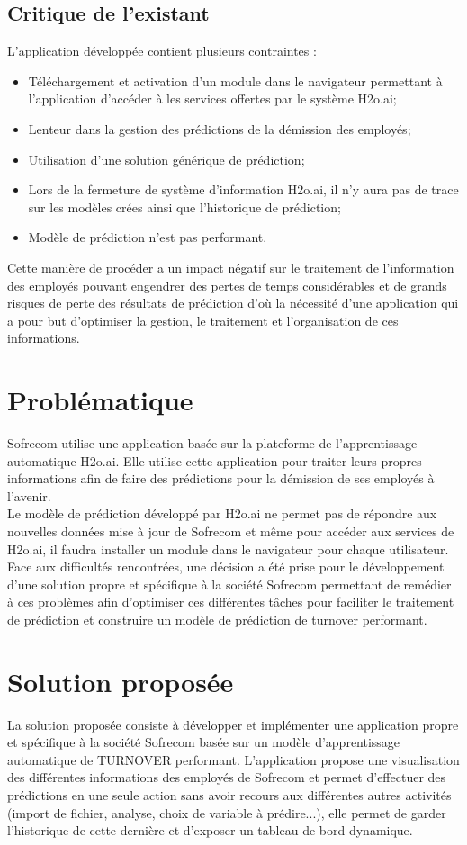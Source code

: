  \subsection{Critique de l’existant}
L'application développée contient plusieurs contraintes :
\begin{itemize}
    \item Téléchargement et activation d'un module dans le navigateur permettant à l'application d'accéder à les services offertes par le système H2o.ai;
     \item Lenteur dans la gestion des prédictions de la démission des employés;
     \item Utilisation d'une solution générique de prédiction;
      \item Lors de la fermeture de système d'information H2o.ai, il n'y aura pas de trace sur les modèles crées ainsi que l'historique de prédiction;
        \item Modèle de prédiction n'est pas performant.
\end{itemize}
\newpage
Cette manière de procéder a un impact négatif sur le traitement de l’information des employés pouvant engendrer des pertes de temps considérables et de grands risques de perte des résultats de prédiction d’où la nécessité d’une application qui a pour but d’optimiser la gestion, le traitement et l’organisation de ces informations.
\section{Problématique}
Sofrecom utilise une application basée sur la plateforme de l'apprentissage automatique H2o.ai.
Elle utilise cette application pour traiter leurs propres informations afin de faire des prédictions pour la démission de ses employés à l'avenir.\\
Le modèle de prédiction développé par H2o.ai ne permet pas de répondre aux nouvelles données mise à jour de Sofrecom et même pour accéder aux services de H2o.ai, il faudra installer un module dans le navigateur pour chaque utilisateur.\\
Face aux difficultés rencontrées, une décision a été prise pour le développement d’une solution propre et spécifique à la société Sofrecom permettant de remédier à ces problèmes afin d'optimiser ces différentes tâches pour faciliter le traitement de prédiction et construire un modèle de prédiction de turnover performant.




\section{Solution proposée}
La solution proposée consiste à développer et implémenter une application propre et spécifique à la société Sofrecom basée sur un modèle d'apprentissage automatique de TURNOVER performant.
L'application propose une visualisation des différentes informations des employés de Sofrecom et permet d'effectuer des prédictions en une seule action sans avoir recours aux différentes autres activités (import de fichier, analyse, choix de variable à prédire...), elle permet de garder l'historique de cette dernière et d'exposer un tableau de bord dynamique.


